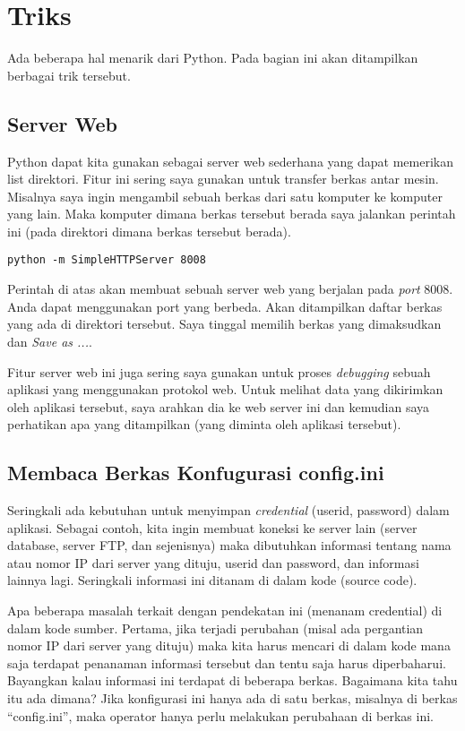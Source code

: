 \chapter{Triks}
Ada beberapa hal menarik dari Python. Pada bagian ini akan ditampilkan berbagai
trik tersebut.

\section{Server Web}
Python dapat kita gunakan sebagai server web sederhana yang dapat memerikan
list direktori. Fitur ini sering saya gunakan untuk transfer berkas antar
mesin. Misalnya saya ingin mengambil sebuah berkas dari satu komputer ke
komputer yang lain. Maka komputer dimana berkas tersebut berada saya jalankan
perintah ini (pada direktori dimana berkas tersebut berada).

\begin{verbatim}
python -m SimpleHTTPServer 8008
\end{verbatim}

Perintah di atas akan membuat sebuah server web yang berjalan pada {\em port}
8008. Anda dapat menggunakan port yang berbeda.
Akan ditampilkan daftar berkas yang ada di direktori tersebut. Saya tinggal
memilih berkas yang dimaksudkan dan {\em Save as ...}.

Fitur server web ini juga sering saya gunakan untuk proses {\em debugging}
sebuah aplikasi yang menggunakan protokol web. Untuk melihat data yang
dikirimkan oleh aplikasi tersebut, saya arahkan dia ke web server ini dan
kemudian saya perhatikan apa yang ditampilkan (yang diminta oleh aplikasi
tersebut).

\section{Membaca Berkas Konfugurasi config.ini}
Seringkali ada kebutuhan untuk menyimpan {\em credential} (userid, password)
dalam aplikasi. Sebagai contoh, kita ingin membuat koneksi ke server lain
(server database, server FTP, dan sejenisnya) maka dibutuhkan informasi
tentang nama atau nomor IP dari server yang dituju, userid dan password,
dan informasi lainnya lagi.
Seringkali informasi ini ditanam di dalam kode (source code).

Apa beberapa masalah terkait dengan pendekatan ini (menanam credential)
di dalam kode sumber.
Pertama, jika terjadi perubahan (misal ada pergantian nomor IP dari server
yang dituju) maka kita harus mencari di dalam kode mana saja terdapat
penanaman informasi tersebut dan tentu saja harus diperbaharui.
Bayangkan kalau informasi ini terdapat di beberapa berkas. 
Bagaimana kita tahu itu ada dimana?
Jika konfigurasi ini hanya ada di satu berkas, misalnya di berkas
``config.ini'', maka operator hanya perlu melakukan perubahaan di berkas ini.

